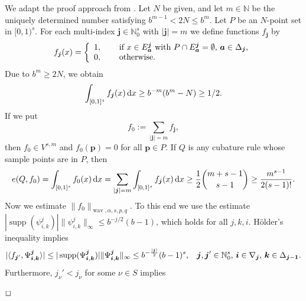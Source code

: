 \documentclass[12pt]{article}
\DeclareMathOperator{\wav}{wav}
\DeclareMathOperator{\supp}{supp}
\newenvironment{proof}{\begin{trivlist}
    \item[\hskip\labelsep{\it Proof.}]}{$\hfill\Box$\end{trivlist}}
\newcommand{\bsa}{\boldsymbol{a}}
\newcommand{\bsk}{\boldsymbol{k}}
\newcommand{\bsi}{\boldsymbol{i}}
\newcommand{\bsj}{\boldsymbol{j}}
\newcommand{\bsp}{\boldsymbol{p}}
\newcommand{\NN}{\mathbb{N}}
\newcommand{\N}{\mathbb{N}}
\begin{document}
\begin{proof}[Proof of Theorem \ref{LowerBound}]
 We adapt the proof approach from \cite[Thm.~9]{HHY04}. Let $N$ be given, and let $m\in\NN$
be the uniquely determined number satisfying $b^{m-1} < 2N \le b^m$.
Let $P$ be an $N$-point set in $[0,1)^s$. For each multi-index $\bsj\in \N^s_0$ with $|\bsj|=m$ we
define functions $f_{\bsj}$ by
\begin{equation*}
 f_{\bsj}(x) = \left\{\begin{array}{ll} 1, & \hspace{3ex}\text{if $x\in E^{\bsj}_{\bsa}$
 with $P\cap E^{\bsj}_{\bsa}=\emptyset$, $\bsa \in \Delta_{\bsj}$,} \\ 0, & \hspace{3ex}\text{otherwise.}\end{array} \right.
\end{equation*}
Due to $b^m \ge 2N$, we obtain
\begin{equation*}
 \int_{[0,1]^s} f_{\bsj}(x)\,{\rm d}x \ge b^{-m}(b^m-N) \ge 1/2.
\end{equation*}
If we put
\begin{equation*}
 f_0 := \sum_{|\bsj|=m} f_{\bsj},
\end{equation*}
then $f_0\in V^{s,m}$ and $f_0(\bsp) = 0$ for all $\bsp\in P$. If $Q$ is any cubature  rule whose sample points are in $P$, then
\begin{equation*}
e(Q, f_0) = \int_{[0,1]^s} f_{0}(x)\,{\rm d}x = \sum_{|\bsj|=m} \int_{[0,1]^s} f_{\bsj}(x)\,{\rm d}x
\ge \frac{1}{2} { m+s-1 \choose s-1} \ge \frac{m^{s-1}}{2(s-1)!}.
\end{equation*}
Now we estimate $\|f_0\|_{\wav,\alpha,s,p,q}$. To this end we use the
estimate $|\supp(\psi^j_{i,k})| \|\psi^j_{i,k}\|_\infty  \le b^{-j/2}(b-1)$, which holds for all $j,k,i$.
H\"older's inequality implies
\begin{equation*}
 |\langle f_{\bsj'}, \Psi^{\bsj}_{\bsi, \bsk} \rangle |
\le |\supp(\Psi^{\bsj}_{\bsi,\bsk})| \|\Psi^{\bsj}_{\bsi,\bsk}\|_\infty 
\le b^{-\frac{|\bsj|}{2}}(b-1)^s,
\hspace{2ex}\text{$\bsj, \bsj'\in \N^s_0$, $\bsi \in \nabla_{\bsj}$, $\bsk\in \Delta_{\bsj -{\bf 1}}$.}
\end{equation*}
Furthermore, $j_\nu' < j_\nu$ for some $\nu\in S$ implies

\end{proof}
\end{document}
